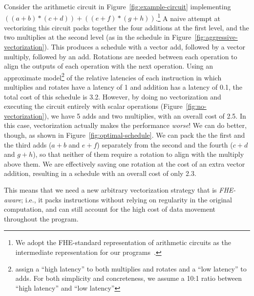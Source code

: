 %
Consider the arithmetic circuit in Figure~\ref{fig:example-circuit} implementing $((a + b) * (c + d)) + ((e + f) * (g + h))$.\footnote{We adopt the FHE-standard representation of arithmetic circuits as the intermediate representation for our programs~\cite{Gentry,CircuitRewriting,Ramparts,Porcupine}.}
A naive attempt at vectorizing this circuit packs together the four additions at the first level, and the two multiplies at the second level (as in the schedule in Figure~\ref{fig:aggressive-vectorization}).
This produces a schedule with a vector add, followed by a vector multiply, followed by an add. Rotations are needed between each operation to align the outputs of each operation with the next operation.
Using an approximate model\footnote{\citet{AlgosHElib} assign a ``high latency'' to both multiplies and rotates and a ``low latency'' to adds. For both simplicity and concreteness, we assume a 10:1 ratio between ``high latency'' and ``low latency''} of the relative latencies of each instruction in which multiplies and rotates have a latency of 1 and addition has a latency of 0.1, the total cost of this schedule is 3.2.
However, by doing no vectorization and executing the circuit entirely with scalar operations (Figure~\ref{fig:no-vectorization}), we have 5 adds and two multiplies, with an overall cost of 2.5.
In this case, vectorization actually makes the performance {\em worse}!
We can do better, though, as shown in Figure~\ref{fig:optimal-schedule}.
We can pack the the first and the third adds ($a + b$ and $e + f$) separately from the second and the fourth ($c + d$ and $g + h$), so that neither of them require a rotation to align with the multiply above them.
We are effectively saving one rotation at the cost of an extra vector addition, resulting in a schedule with an overall cost of only 2.3.

This means that we need a new arbitrary vectorization strategy that is {\em FHE-aware}; i.e., it packs instructions without relying on regularity in the original computation, and can still account for the high cost of data movement throughout the program.

